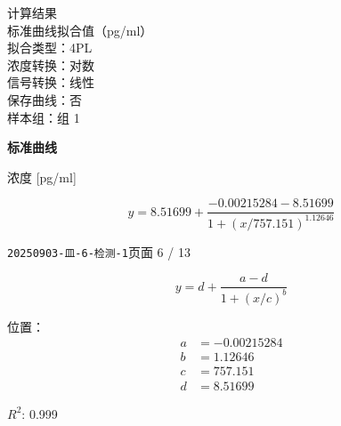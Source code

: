 \documentclass[UTF8,10pt,a4paper,fontset=fandol]{ctexart}
\begin{document}

\medskip

\noindent
计算结果\\
\quad 标准曲线拟合值（pg/ml）\\
\quad 拟合类型：4PL\\
\quad 浓度转换：对数\\
\quad 信号转换：线性\\
\quad 保存曲线：否\\
\quad 样本组：组 1

\begin{center}
\textbf{标准曲线}

\vspace{0.5em}

\vspace{0.5em}
浓度 [pg/ml]
\end{center}

\[
y = 8.51699+
\frac{-0.00215284-8.51699}
{1+\left(x/757.151\right)^{1.12646}}
\]

\newpage

\noindent\texttt{20250903-皿-6-检测-1}\hfill 页面 6 / 13

\[
y=d+\frac{a-d}{1+(x/c)^b}
\]

\noindent
位置：
\[
\begin{array}{ll}
a&=-0.00215284\\
b&=1.12646\\
c&=757.151\\
d&=8.51699
\end{array}
\]

\noindent
$R^2$: 0.999
\end{document}
